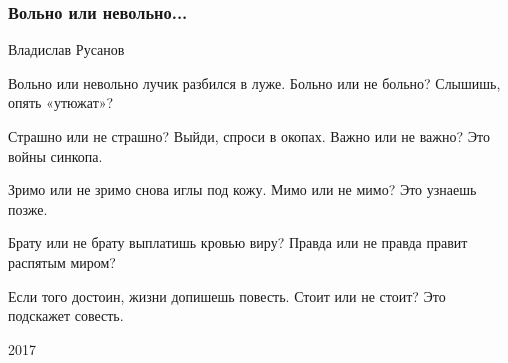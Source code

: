  
 
 

\subsubsection{Вольно или невольно...}

Владислав Русанов

Вольно или невольно
лучик разбился в луже.
Больно или не больно?
Слышишь, опять «утюжат»?

Страшно или не страшно?
Выйди, спроси в окопах.
Важно или не важно?
Это войны синкопа.

Зримо или не зримо
снова иглы под кожу.
Мимо или не мимо?
Это узнаешь позже.

Брату или не брату
выплатишь кровью виру?
Правда или не правда
правит распятым миром?

Если того достоин,
жизни допишешь повесть.
Стоит или не стоит?
Это подскажет совесть.

2017 
